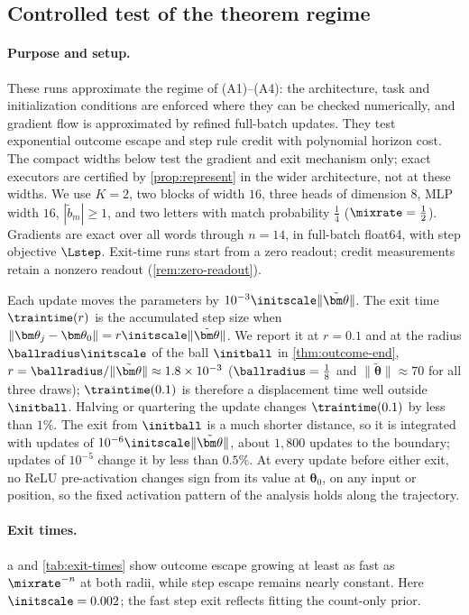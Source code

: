 \subsection{Controlled test of the theorem regime}
\label{app:exp-regime}
\label{app:regime}
\paragraph{Purpose and setup.} These runs approximate the regime of (A1)--(A4): the architecture, task and initialization conditions are enforced where
they can be checked numerically, and gradient flow is approximated by refined full-batch updates. They test exponential outcome
escape and step rule credit with polynomial horizon cost. The compact widths below test the gradient and exit mechanism only;
exact executors are certified by \cref{prop:represent} in the wider architecture, not at these widths.
We use $K=2$, two blocks of width $16$, three heads of dimension $8$, MLP width $16$, $|\tilde b_m|\ge1$,
and two letters with match probability $\tfrac{1}{4}$ ($\mixrate=\tfrac{1}{2}$). Gradients are exact over all words through $n=14$,
in full-batch float64, with step objective $\Lstep$. Exit-time runs start from a zero readout; credit measurements retain a
nonzero readout (\cref{rem:zero-readout}).

Each update moves the parameters by $10^{-3}\initscale\|\tilde{\bm\theta}\|$.
The exit time $\traintime(r)$ is the accumulated step size when $\|\bm\theta_j-\bm\theta_0\|=r\initscale\|\tilde{\bm\theta}\|$. We report it at
$r=0.1$ and at the radius $\ballradius\initscale$ of the ball $\initball$ in \cref{thm:outcome-end}, $r=\ballradius/\|\tilde{\bm\theta}\|\approx1.8\times10^{-3}$
($\ballradius=\tfrac{1}{8}$ and $\|\tilde{\bm\theta}\|\approx70$ for all three draws); $\traintime(0.1)$ is therefore a displacement time well outside $\initball$.
Halving or quartering the update changes $\traintime(0.1)$ by less than $1\%$. The exit from $\initball$ is a much shorter distance, so
it is integrated with updates of $10^{-6}\initscale\|\tilde{\bm\theta}\|$, about $1{,}800$ updates to the boundary; updates of $10^{-5}$ change it by
less than $0.5\%$. At every update before either exit, no ReLU pre-activation
changes sign from its value at $\bm\theta_0$, on any input or position, so the fixed activation pattern of the analysis holds along the trajectory.

\paragraph{Exit times.} a and \cref{tab:exit-times} show outcome escape growing at least as fast as
$\mixrate^{-n}$ at both radii, while step escape remains nearly constant. Here $\initscale=0.002$; the fast step exit reflects fitting the
count-only prior.

